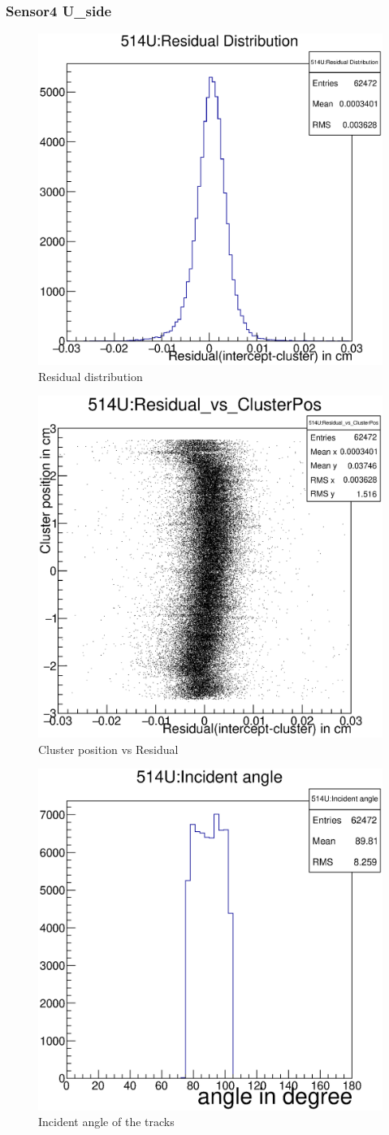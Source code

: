\documentclass[12pt]{article}
\begin{document}
					\pagebreak
						\subsubsection{Sensor4 U\_side}
						\begin{multicols}{3}
							
							\begin{figure}[H]
								\includegraphics[width=.3\textwidth]{514U:residualplot.eps}	
								\caption{Residual distribution}	
								\label{fig1}	
							\end{figure}
							\begin{figure}[H]
								\includegraphics[width=.3\textwidth]{514U:residual_vs_clusterpos.eps}	
								\caption{Cluster position vs Residual}	
								\label{fig2}	
							\end{figure}
							\begin{figure}[H]
								\includegraphics[width=.3\textwidth]{514U:incident_angle.eps}	
								\caption{Incident angle of the tracks}	
								\label{fig2}	
							\end{figure}
						\end{multicols}
						
\end{document}
